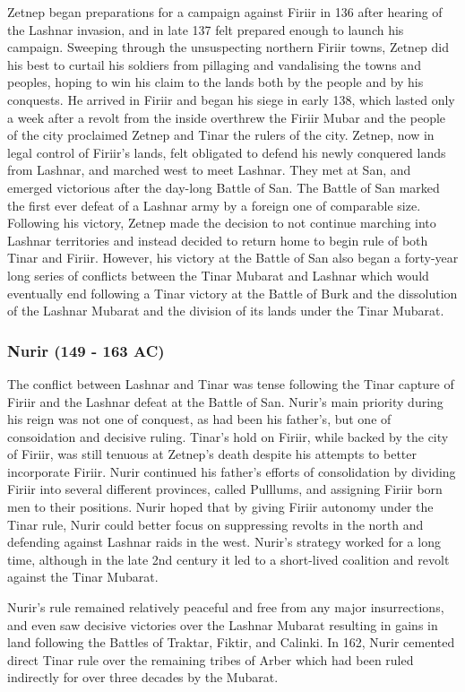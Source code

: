 			Zetnep began preparations for a campaign against Firiir in 136 after hearing of the Lashnar invasion, and in late 137 felt prepared enough to launch his campaign. Sweeping through the unsuspecting northern Firiir towns, Zetnep did his best to curtail his soldiers from pillaging and vandalising the towns and peoples, hoping to win his claim to the lands both by the people and by his conquests. He arrived in Firiir and began his siege in early 138, which lasted only a week after a revolt from the inside overthrew the Firiir Mubar and the people of the city proclaimed Zetnep and Tinar the rulers of the city. Zetnep, now in legal control of Firiir's lands, felt obligated to defend his newly conquered lands from Lashnar, and marched west to meet Lashnar. They met at San, and emerged victorious after the day-long Battle of San. The Battle of San marked the first ever defeat of a Lashnar army by a foreign one of comparable size. Following his victory, Zetnep made the decision to not continue marching into Lashnar territories and instead decided to return home to begin rule of both Tinar and Firiir. However, his victory at the Battle of San also began a forty-year long series of conflicts between the Tinar Mubarat and Lashnar which would eventually end following a Tinar victory at the Battle of Burk and the dissolution of the Lashnar Mubarat and the division of its lands under the Tinar Mubarat.
		\subsubsection{Nurir (149 - 163 AC)}
			The conflict between Lashnar and Tinar was tense following the Tinar capture of Firiir and the Lashnar defeat at the Battle of San. Nurir's main priority during his reign was not one of conquest, as had been his father's, but one of consoidation and decisive ruling. Tinar's hold on Firiir, while backed by the city of Firiir, was still tenuous at Zetnep's death despite his attempts to better incorporate Firiir. Nurir continued his father's efforts of consolidation by dividing Firiir into several different provinces, called Pulllums, and assigning Firiir born men to their positions. Nurir hoped that by giving Firiir autonomy under the Tinar rule, Nurir could better focus on suppressing revolts in the north and defending against Lashnar raids in the west. Nurir's strategy worked for a long time, although in the late 2nd century it led to a short-lived coalition and revolt against the Tinar Mubarat. 
			
			Nurir's rule remained relatively peaceful and free from any major insurrections, and even saw decisive victories over the Lashnar Mubarat resulting in gains in land following the Battles of Traktar, Fiktir, and Calinki. In 162, Nurir cemented direct Tinar rule over the remaining tribes of Arber which had been ruled indirectly for over three decades by the Mubarat.
